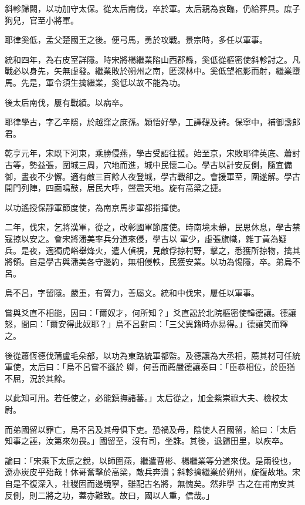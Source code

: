 \begin{pinyinscope}
 斜軫歸闕，以功加守太保。從太后南伐，卒於軍。太后親為哀臨，仍給葬具。庶子狗兒，官至小將軍。



 耶律奚低，孟父楚國王之後。便弓馬，勇於攻戰。景宗時，多任以軍事。



 統和四年，為右皮室詳隱。時宋將楊繼業陷山西郡縣，奚低從樞密使斜軫討之。凡戰必以身先，矢無虛發。繼業敗於朔州之南，匿深林中。奚低望袍影而射，繼業墮馬。先是，軍令須生擒繼業，奚低以故不能為功。



 後太后南伐，屢有戰績。以病卒。



 耶律學古，字乙辛隱，於越窪之庶孫。穎悟好學，工譯鞮及詩。保寧中，補御盞郎君。



 乾亨元年，宋既下河東，乘勝侵燕，學古受詔往援。始至京，宋敗耶律英底、蕭討古等，勢益張，圍城三周，穴地而進，城中民懷二心。學古以計安反側，隨宜備御，晝夜不少懈。適有敵三百餘人夜登城，學古戰卻之。會援軍至，圍遂解。學古開門列陣，四面鳴鼓，居民大呼，聲震天地。旋有高梁之捷。



 以功遙授保靜軍節度使，為南京馬步軍都指揮使。



 二年，伐宋，乞將漢軍，從之，改彰國軍節度使。時南境未靜，民思休息，學古禁寇掠以安之。會宋將潘美率兵分道來侵，學古以
 軍少，虛張旗幟，雜丁黃為疑兵。是夜，適獨虎峪舉烽火，遣人偵視，見敵俘掠村野，擊之，悉獲所掠物，擒其將領。自是學古與潘美各守邊約，無相侵軼，民獲安業。以功為惕隱，卒。弟烏不呂。



 烏不呂，字留隱。嚴重，有膂力，善屬文。統和中伐宋，屢任以軍事。



 嘗與爻直不相能，因曰：「爾奴才，何所知？」爻直訟於北院樞密使韓德讓。德讓怒，間曰：「爾安得此奴耶？」烏不呂對曰：「三父異籍時亦易得。」德讓笑而釋之。



 後從蕭恆德伐蒲盧毛朵部，以功為東路統軍都監。及德讓為大丞相，薦其材可任統軍使，太后曰：「烏不呂嘗不遜於
 卿，何善而薦嚴德讓奏曰：「臣恭相位，於臣猶不屈，況於其餘。



 以此知可用。若任使之，必能鎮撫諸蕃。」太后從之，加金紫崇祿大夫、檢校太尉。



 而弟國留以罪亡，烏不呂及其母俱下吏。恐禍及母，陰使人召國留，給曰：「太后知事之誣，汝第來勿畏。」國留至，沒有司，坐誅。其後，退歸田里，以疾卒。



 論曰：「宋乘下太原之銳，以師圍燕，繼遣曹彬、楊繼業等分道來伐。是兩役也，遼亦炭皮乎殆哉！休哥奮擊於高梁，敵兵奔潰；斜軫擒繼業於朔州，旋復故地。宋自是不復深入，社稷固而邊境寧，雖配古名將，無愧矣。然非學
 古之在甫南安其反側，則二將之功，蓋亦難致。故曰，國以人重，信哉。」



\end{pinyinscope}